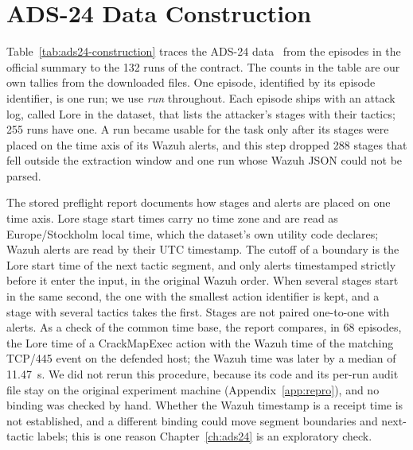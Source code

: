 \chapter{ADS-24 Data Construction}
\label{app:ads24-data}

Table~\ref{tab:ads24-construction} traces the ADS-24
data~\cite{nyberg2026cyber} from the episodes in the official summary to the
132 runs of the contract.
The counts in the table are our own tallies
from the downloaded files. One episode, identified by its episode
identifier, is one run; we use \emph{run} throughout. Each episode ships
with an attack log, called Lore in the dataset, that lists the
attacker's stages with their tactics; 255 runs have one. A run became
usable for the task only after its stages were placed on the time axis
of its Wazuh alerts, and this step dropped 288 stages that fell outside
the extraction window and one run whose Wazuh JSON could not be parsed.

The stored preflight report documents how stages and alerts are placed
on one time axis. Lore stage start times carry no time zone and are
read as Europe/Stockholm local time, which the dataset's own utility
code declares; Wazuh alerts are read by their UTC timestamp. The cutoff
of a boundary is the Lore start time of the next tactic segment, and
only alerts timestamped strictly before it enter the input, in the
original Wazuh order. When several stages start in the same second,
the one with the smallest action identifier is kept, and a stage with
several tactics takes the first. Stages are not paired one-to-one with
alerts. As a check of the common time base, the report compares, in 68
episodes, the Lore time of a CrackMapExec action with the Wazuh time of
the matching TCP/445 event on the defended host; the Wazuh time was
later by a median of 11.47~s. We did not rerun this procedure, because
its code and its per-run audit file stay on the original experiment
machine (Appendix~\ref{app:repro}), and no binding was checked by
hand. Whether the Wazuh timestamp is
a receipt time is not established, and a different binding could move
segment boundaries and next-tactic labels; this is one reason
Chapter~\ref{ch:ads24} is an exploratory check.

